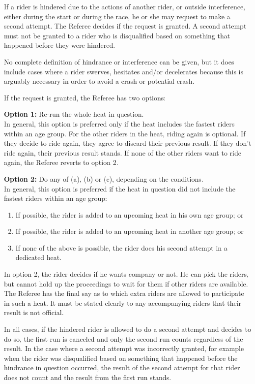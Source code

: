 If a rider is hindered due to the actions of another rider, or outside interference, either during the start or during the race, he or she may request to make a second attempt.
The Referee decides if the request is granted.
A second attempt must not be granted to a rider who is disqualified based on something that happened before they were hindered.

No complete definition of hindrance or interference can be given, but it does include cases where a rider swerves, hesitates and/or decelerates because this is arguably necessary in order to avoid a crash or potential crash.

If the request is granted, the Referee has two options:

\textbf{Option 1:}
Re-run the whole heat in question.\\
In general, this option is preferred only if the heat includes the fastest riders within an age group.
For the other riders in the heat, riding again is optional.
If they decide to ride again, they agree to discard their previous result.
If they don't ride again, their previous result stands.
If none of the other riders want to ride again, the Referee reverts to option 2.

\textbf{Option 2:}
Do any of (a), (b) or (c), depending on the conditions.\\
In general, this option is preferred if the heat in question did not include the fastest riders within an age group:
\begin{enumerate}[label=(\alph*)]
\item If possible, the rider is added to an upcoming heat in his own age group; or
\item If possible, the rider is added to an upcoming heat in another age group; or
\item If none of the above is possible, the rider does his second attempt in a dedicated heat.
\end{enumerate}
In option 2, the rider decides if he wants company or not.
He can pick the riders, but cannot hold up the proceedings to wait for them if other riders are available.
The Referee has the final say as to which extra riders are allowed to participate in such a heat.
It must be stated clearly to any accompanying riders that their result is not official.

In all cases, if the hindered rider is allowed to do a second attempt and decides to do so, the first run is canceled and only the second run counts regardless of the result.
In the case where a second attempt was incorrectly granted, for example when the rider was disqualified based on something that happened before the hindrance in question occurred, the result of the second attempt for that rider does not count and the result from the first run stands.

